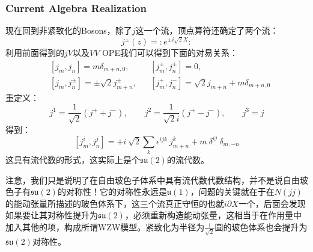 \subsubsection{Current Algebra Realization}
现在回到非紧致化的Bosons，除了$j$这一个流，顶点算符还确定了两个流：
\begin{equation}
	j^\pm(z)=:e^{\pm i\sqrt{2}X}:
\end{equation}
利用前面得到的$jV$以及$VV$ OPE我们可以得到下面的对易关系：
\begin{equation}
	\boxed{
		\begin{aligned}
			&\left[j_m,j_n\right]=m\delta_{m+n,0},&&\left[j_m^\pm,j_n^\pm\right]=0,\\
			&\left[j_m,j_n^\pm\right]=\pm\sqrt{2}j_{m+n}^\pm,&&\left[j_m^+,j_n^-\right]=\sqrt{2}j_{m+n}+m\delta_{m+n,0}
		\end{aligned}
	}
\end{equation}
重定义：
\begin{equation}
	j^1=\frac1{\sqrt{2}}\left(j^++j^-\right),\quad\quad j^2=\frac1{\sqrt{2}i}\left(j^+-j^-\right),\quad\quad j^3=j
\end{equation}
得到：
\begin{equation}
	\boxed{
		\left[j_m^i,j_n^j\right]=+i\mathrm{~}\sqrt{2}\sum_k\epsilon^{ijk}\mathrm{~}j_{m+n}^k+m\mathrm{~}\delta^{ij}\mathrm{~}\delta_{m,-n}
	}
\end{equation}
这具有流代数的形式，这实际上是个$\mathfrak{su}(2)$的流代数。
\begin{remark}
	注意，我们只是说明了在自由玻色子体系中具有流代数代数结构，并不是说自由玻色子有$\mathfrak{su}(2)$的对称性！它的对称性永远是$\mathfrak{u}(1)$，问题的关键就在于在$N(jj)$的能动张量所描述的玻色体系下，这三个流真正守恒的也就$i\partial X$一个，后面会发现如果要让其对称性提升为$\mathfrak{su}(2)$，必须重新构造能动张量，这相当于在作用量中加入其他的项，构成所谓WZW模型。紧致化为半径为$\frac{1}{\sqrt{2}}$圆的玻色体系也会提升为$\mathfrak{su}(2)$对称性。
\end{remark}
